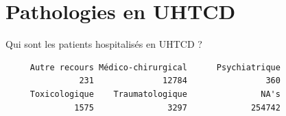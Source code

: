 \documentclass[]{article}
\newenvironment{Shaded}{\begin{snugshade}}{\end{snugshade}}
\newcommand{\KeywordTok}[1]{\textcolor[rgb]{0.13,0.29,0.53}{\textbf{{#1}}}}
\newcommand{\StringTok}[1]{\textcolor[rgb]{0.31,0.60,0.02}{{#1}}}
\newcommand{\NormalTok}[1]{{#1}}
\begin{document}
\section{Pathologies en UHTCD}\label{pathologies-en-uhtcd}

Qui sont les patients hospitalisés en UHTCD ?

\begin{Shaded}
\end{Shaded}

\begin{verbatim}
     Autre recours Médico-chirurgical      Psychiatrique 
               231              12784                360 
     Toxicologique    Traumatologique               NA's 
              1575               3297             254742 
\end{verbatim}

\begin{Shaded}
\end{Shaded}
\end{document}

